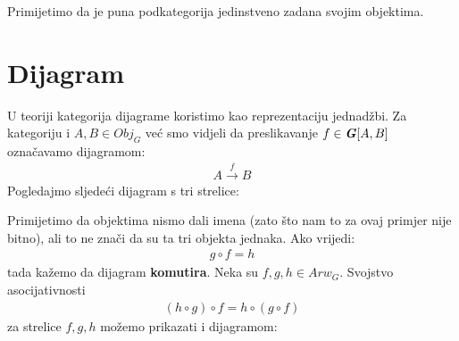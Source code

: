 \noindent Primijetimo da je puna podkategorija jedinstveno zadana svojim objektima.
  \newpage
  \section{Dijagram}
  U teoriji kategorija dijagrame koristimo kao reprezentaciju jednadžbi.
  Za kategoriju  i $A, B \in Obj_G$ već smo vidjeli da
  preslikavanje $f \in \textbf{\emph{G}}[A, B]$ označavamo dijagramom:
  \begin{align*}
    A \xrightarrow{f} B
  \end{align*}
  Pogledajmo sljedeći dijagram s tri strelice:
  \begin{center}
  \end{center}
  Primijetimo da objektima nismo dali imena (zato što nam to za ovaj primjer nije
  bitno), ali to ne znači da su ta tri objekta jednaka. Ako vrijedi:
  \begin{align*}
    g \circ f = h
  \end{align*}
  tada kažemo da dijagram \textbf{komutira}. Neka su $f, g, h \in Arw_G$.
  Svojstvo asocijativnosti
  \begin{align*}
    (h \circ g) \circ f = h \circ (g \circ f)
  \end{align*}
   za strelice $f, g, h$ možemo prikazati i dijagramom:
  \begin{center}
  \end{center}



